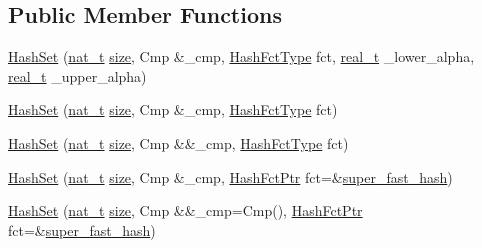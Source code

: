 \subsection*{Public Member Functions}
\begin{DoxyCompactItemize}
\item 
\hyperlink{class_designar_1_1_hash_set_afb5e932ee4dcc9b1dec4d6eefd810c32}{Hash\+Set} (\hyperlink{namespace_designar_aa72662848b9f4815e7bf31a7cf3e33d1}{nat\+\_\+t} \hyperlink{class_designar_1_1_hash_set_a0026e1b2caf94d25b554cd6a399f691f}{size}, Cmp \&\+\_\+cmp, \hyperlink{class_designar_1_1_hash_set_a05d8d111665c25bc17290c01fa299398}{Hash\+Fct\+Type} fct, \hyperlink{namespace_designar_aca2c32af26808dbec1f3a3071fad25ce}{real\+\_\+t} \+\_\+lower\+\_\+alpha, \hyperlink{namespace_designar_aca2c32af26808dbec1f3a3071fad25ce}{real\+\_\+t} \+\_\+upper\+\_\+alpha)
\item 
\hyperlink{class_designar_1_1_hash_set_a6f60ca18ef5bcf8560b9827ca9678e58}{Hash\+Set} (\hyperlink{namespace_designar_aa72662848b9f4815e7bf31a7cf3e33d1}{nat\+\_\+t} \hyperlink{class_designar_1_1_hash_set_a0026e1b2caf94d25b554cd6a399f691f}{size}, Cmp \&\+\_\+cmp, \hyperlink{class_designar_1_1_hash_set_a05d8d111665c25bc17290c01fa299398}{Hash\+Fct\+Type} fct)
\item 
\hyperlink{class_designar_1_1_hash_set_aa57bbddb93c59eda7551cf9cf6b9220e}{Hash\+Set} (\hyperlink{namespace_designar_aa72662848b9f4815e7bf31a7cf3e33d1}{nat\+\_\+t} \hyperlink{class_designar_1_1_hash_set_a0026e1b2caf94d25b554cd6a399f691f}{size}, Cmp \&\&\+\_\+cmp, \hyperlink{class_designar_1_1_hash_set_a05d8d111665c25bc17290c01fa299398}{Hash\+Fct\+Type} fct)
\item 
\hyperlink{class_designar_1_1_hash_set_ac9204afce59af28d1360c50f11b5694e}{Hash\+Set} (\hyperlink{namespace_designar_aa72662848b9f4815e7bf31a7cf3e33d1}{nat\+\_\+t} \hyperlink{class_designar_1_1_hash_set_a0026e1b2caf94d25b554cd6a399f691f}{size}, Cmp \&\+\_\+cmp, \hyperlink{class_designar_1_1_hash_set_a7a8b0a4970519ebc9ccc1ad247d0639f}{Hash\+Fct\+Ptr} fct=\&\hyperlink{namespace_designar_afd5712d16b3ae1c1c7d59f1004cd96fd}{super\+\_\+fast\+\_\+hash})
\item 
\hyperlink{class_designar_1_1_hash_set_a007cbe70f94c249ccebaf68006bbf0f4}{Hash\+Set} (\hyperlink{namespace_designar_aa72662848b9f4815e7bf31a7cf3e33d1}{nat\+\_\+t} \hyperlink{class_designar_1_1_hash_set_a0026e1b2caf94d25b554cd6a399f691f}{size}, Cmp \&\&\+\_\+cmp=Cmp(), \hyperlink{class_designar_1_1_hash_set_a7a8b0a4970519ebc9ccc1ad247d0639f}{Hash\+Fct\+Ptr} fct=\&\hyperlink{namespace_designar_afd5712d16b3ae1c1c7d59f1004cd96fd}{super\+\_\+fast\+\_\+hash})

\end{DoxyCompactItemize}
